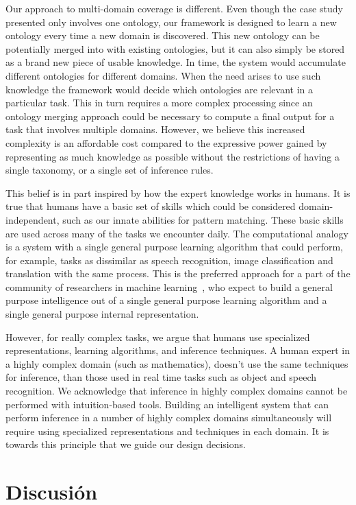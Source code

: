 Our approach to multi-domain coverage is different. Even though the case study presented only involves
one ontology, our framework is designed to learn a new ontology every time
a new domain is discovered. This new ontology can be potentially merged into with
existing ontologies, but it can also simply be stored as a brand new piece of usable knowledge.
In time, the system would accumulate different ontologies for different domains.
When the need arises to use such knowledge %
the framework would decide which ontologies are relevant in a particular task. %
This in turn requires a more complex processing since an ontology merging approach could be
necessary to compute a final output for a task that involves multiple domains. However, we believe this increased
complexity is an affordable cost compared to the expressive power gained by representing as much knowledge
as possible without the restrictions of having a single taxonomy, or a single set of inference rules.

This belief is in part inspired by how the expert knowledge works in humans. It is true that
humans have a basic set of skills which could be considered domain-independent, such as our innate
abilities for pattern matching. These basic skills are used across many of the tasks we encounter daily.
The computational analogy is a system with a single general purpose learning algorithm that could
perform, for example, tasks as dissimilar as  speech recognition, image classification and translation
with the same process.
This is the preferred approach for a part of the community of researchers in machine learning~\cite{kaiser2017one},
who expect to build a general purpose intelligence out of a single general purpose learning algorithm
and a single general purpose internal representation.

However, for really complex tasks, we argue that humans use specialized representations,
learning algorithms, and inference techniques. A human expert in a highly complex domain (such as mathematics),
doesn't use the same techniques for inference, than those used in real time tasks such
as object and speech recognition. We acknowledge that inference in highly complex domains cannot be
performed with intuition-based tools. Building an intelligent
system that can perform inference in a number of highly complex domains simultaneously will
require using specialized representations and techniques in each domain. It is towards this
principle that we guide our design decisions.

  \section{Discusión}
